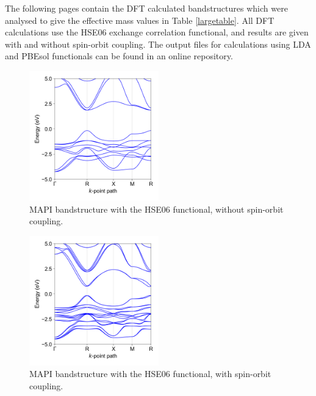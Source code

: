 The following pages contain the DFT calculated bandstructures which were analysed to give the effective mass values in Table \ref{largetable}. All DFT calculations use the HSE06 exchange correlation functional, and results  are given with and without spin-orbit coupling. The output files for calculations using LDA and PBEsol functionals can be found in an online repository.\autocite{Whalley2018b}

\begin{figure}[htb] \centering
\includegraphics[width=0.5\textwidth]{./figures/ap2/MAPI_hybrid.png}
\caption[ bandstructure, HSE06, no-SoC]{MAPI bandstructure with the HSE06 functional, without spin-orbit coupling. }
\end{figure}

\begin{figure}[htb] \centering
\includegraphics[width=0.5\textwidth]{./figures/ap2/MAPI_hybrid_SoC.png}
\caption[ bandstructure, HSE06, SoC]{MAPI bandstructure with the HSE06 functional, with spin-orbit coupling. }
\end{figure}

\clearpage

